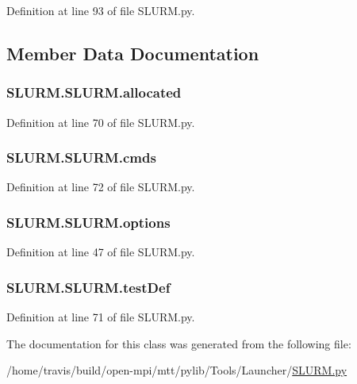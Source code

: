 Definition at line 93 of file S\-L\-U\-R\-M.\-py.



\subsection{Member Data Documentation}
\hypertarget{classSLURM_1_1SLURM_aee4130d6ff2007d08fad045aedd69781}{
\subsubsection[{allocated}]{\setlength{\rightskip}{0pt plus 5cm}S\-L\-U\-R\-M.\-S\-L\-U\-R\-M.\-allocated}}\label{classSLURM_1_1SLURM_aee4130d6ff2007d08fad045aedd69781}


Definition at line 70 of file S\-L\-U\-R\-M.\-py.

\hypertarget{classSLURM_1_1SLURM_ab755a940fd09c8fa416c177f692d31d6}{
\subsubsection[{cmds}]{\setlength{\rightskip}{0pt plus 5cm}S\-L\-U\-R\-M.\-S\-L\-U\-R\-M.\-cmds}}\label{classSLURM_1_1SLURM_ab755a940fd09c8fa416c177f692d31d6}


Definition at line 72 of file S\-L\-U\-R\-M.\-py.

\hypertarget{classSLURM_1_1SLURM_a652a43986b8bda5c6ddb866ab0513ac8}{
\subsubsection[{options}]{\setlength{\rightskip}{0pt plus 5cm}S\-L\-U\-R\-M.\-S\-L\-U\-R\-M.\-options}}\label{classSLURM_1_1SLURM_a652a43986b8bda5c6ddb866ab0513ac8}


Definition at line 47 of file S\-L\-U\-R\-M.\-py.

\hypertarget{classSLURM_1_1SLURM_a9b08ef79e039a8524f1fa6712b45182b}{
\subsubsection[{test\-Def}]{\setlength{\rightskip}{0pt plus 5cm}S\-L\-U\-R\-M.\-S\-L\-U\-R\-M.\-test\-Def}}\label{classSLURM_1_1SLURM_a9b08ef79e039a8524f1fa6712b45182b}


Definition at line 71 of file S\-L\-U\-R\-M.\-py.



The documentation for this class was generated from the following file\-:\begin{DoxyCompactItemize}
\item 
/home/travis/build/open-\/mpi/mtt/pylib/\-Tools/\-Launcher/\hyperlink{SLURM_8py}{S\-L\-U\-R\-M.\-py}\end{DoxyCompactItemize}
